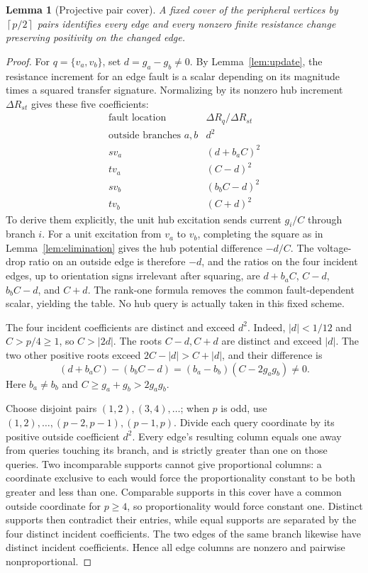 \documentclass[11pt,letterpaper]{article}
\newtheorem{lemma}[theorem]{Lemma}
\newcommand{\ceil}[1]{\left\lceil #1\right\rceil}
\begin{document}
\begin{lemma}[Projective pair cover]\label{lem:projective}
A fixed cover of the peripheral vertices by $\ceil{p/2}$ pairs identifies every edge and every nonzero finite resistance change preserving positivity on the changed edge.
\end{lemma}
\begin{proof}
For $q=\{v_a,v_b\}$, set $d=g_a-g_b\ne0$. By Lemma~\ref{lem:update}, the resistance increment for an edge fault is a scalar depending on its magnitude times a squared transfer signature. Normalizing by its nonzero hub increment $\Delta R_{st}$ gives these five coefficients:
\[
 \begin{array}{c|c}
 \text{fault location}&\Delta R_q/\Delta R_{st}\\ \hline
 \text{outside branches }a,b&d^2\\
 sv_a&(d+b_a C)^2\\
 tv_a&(C-d)^2\\
 sv_b&(b_b C-d)^2\\
 tv_b&(C+d)^2
 \end{array}
\]
To derive them explicitly, the unit hub excitation sends current $g_i/C$ through branch $i$. For a unit excitation from $v_a$ to $v_b$, completing the square as in Lemma~\ref{lem:elimination} gives the hub potential difference $-d/C.$ The voltage-drop ratio on an outside edge is therefore $-d$, and the ratios on the four incident edges, up to orientation signs irrelevant after squaring, are $d+b_aC$, $C-d$, $b_bC-d$, and $C+d$. The rank-one formula removes the common fault-dependent scalar, yielding the table. No hub query is actually taken in this fixed scheme.

The four incident coefficients are distinct and exceed $d^2$. Indeed, $|d|<1/12$ and $C>p/4\ge1$, so $C>|2d|$. The roots $C-d,C+d$ are distinct and exceed $|d|$. The two other positive roots exceed $2C-|d|>C+|d|$, and their difference is
\[
 (d+b_aC)-(b_bC-d)=(b_a-b_b)(C-2g_ag_b)\ne0.
\]
Here $b_a\ne b_b$ and $C\ge g_a+g_b>2g_ag_b$.

Choose disjoint pairs $(1,2),(3,4),\ldots$; when $p$ is odd, use $(1,2),\ldots,(p-2,p-1),(p-1,p)$. Divide each query coordinate by its positive outside coefficient $d^2$. Every edge's resulting column equals one away from queries touching its branch, and is strictly greater than one on those queries. Two incomparable supports cannot give proportional columns: a coordinate exclusive to each would force the proportionality constant to be both greater and less than one. Comparable supports in this cover have a common outside coordinate for $p\ge4$, so proportionality would force constant one. Distinct supports then contradict their entries, while equal supports are separated by the four distinct incident coefficients. The two edges of the same branch likewise have distinct incident coefficients. Hence all edge columns are nonzero and pairwise nonproportional.


\end{proof}
\end{document}
